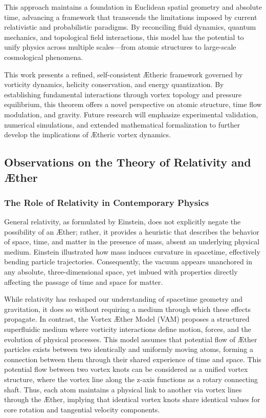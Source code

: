 \documentclass[a4paper,10pt]{article}
\begin{document}
    This approach maintains a foundation in Euclidean spatial geometry and absolute time, advancing a framework that transcends the limitations imposed by current relativistic and probabilistic paradigms. By reconciling fluid dynamics, quantum mechanics, and topological field interactions, this model has the potential to unify physics across multiple scales—from atomic structures to large-scale cosmological phenomena.


    This work presents a refined, self-consistent \AE theric framework governed by vorticity dynamics, helicity conservation, and energy quantization. By establishing fundamental interactions through vortex topology and pressure equilibrium, this theorem offers a novel perspective on atomic structure, time flow modulation, and gravity. Future research will emphasize experimental validation, numerical simulations, and extended mathematical formalization to further develop the implications of \AE theric vortex dynamics.



    \subsection{Observations on the Theory of Relativity and \AE ther}
    \subsubsection*{The Role of Relativity in Contemporary Physics}
    General relativity, as formulated by Einstein, does not explicitly negate the possibility of an \AE ther; rather, it provides a heuristic that describes the behavior of space, time, and matter in the presence of mass, absent an underlying physical medium. Einstein illustrated how mass induces curvature in spacetime, effectively bending particle trajectories. Consequently, the vacuum appears unanchored in any absolute, three-dimensional space, yet imbued with properties directly affecting the passage of time and space for matter.

    While relativity has reshaped our understanding of spacetime geometry and gravitation, it does so without requiring a medium through which these effects propagate. In contrast, the Vortex \AE ther Model (VAM) proposes a structured superfluidic medium where vorticity interactions define motion, forces, and the evolution of physical processes. This model assumes that potential flow of \AE ther particles exists between two identically and uniformly moving atoms, forming a connection between them through their shared experience of time and space. This potential flow between two vortex knots can be considered as a unified vortex structure, where the vortex line along the z-axis functions as a rotary connecting shaft. Thus, each atom maintains a physical link to another via vortex lines through the \AE ther, implying that identical vortex knots share identical values for core rotation and tangential velocity components.
\end{document}
